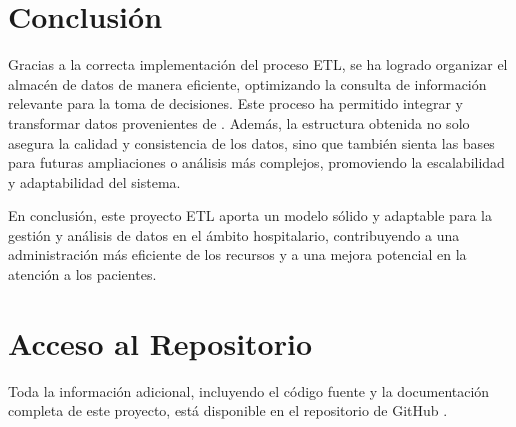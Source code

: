 \documentclass{article}
\begin{document}
	 

	\section{Conclusión}
	\label{sec:conclusion}
	
	Gracias a la correcta implementación del proceso ETL, se ha logrado organizar el almacén de datos de manera eficiente, optimizando la consulta de información relevante para la toma de decisiones. Este proceso ha permitido integrar y transformar datos provenientes de \cite{eicu_crd}. Además, la estructura obtenida no solo asegura la calidad y consistencia de los datos, sino que también sienta las bases para futuras ampliaciones o análisis más complejos, promoviendo la escalabilidad y adaptabilidad del sistema.
	
	En conclusión, este proyecto ETL aporta un modelo sólido y adaptable para la gestión y análisis de datos en el ámbito hospitalario, contribuyendo a una administración más eficiente de los recursos y a una mejora potencial en la atención a los pacientes.
	
	\newpage
	\section{Acceso al Repositorio}
	
	Toda la información adicional, incluyendo el código fuente y la documentación completa de este proyecto, está disponible en el repositorio de GitHub \cite{silva2024github}.
	
	
\end{document}
